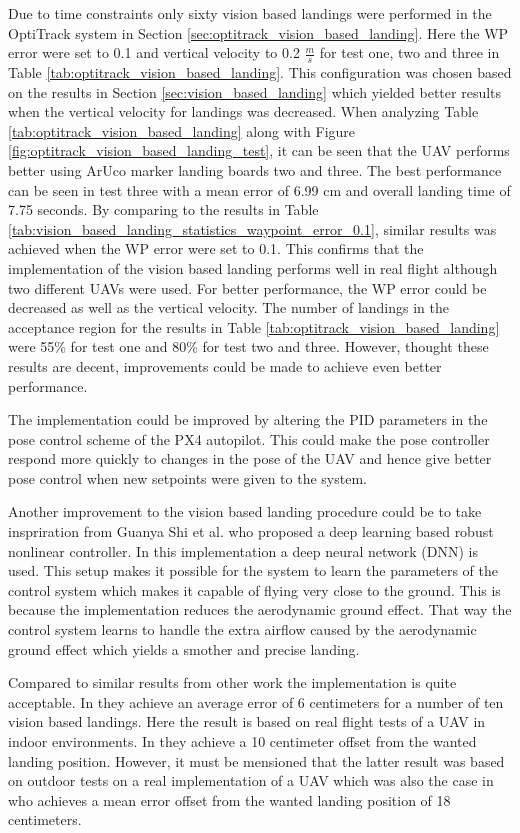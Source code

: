 \documentclass[../Head/report.tex]{subfiles}
\begin{document}
Due to time constraints only sixty vision based landings were performed in the OptiTrack system in Section \ref{sec:optitrack_vision_based_landing}. Here the WP error were set to 0.1 and vertical velocity to 0.2 $\frac{m}{s}$ for test one, two and three in Table \ref{tab:optitrack_vision_based_landing}. This configuration was chosen based on the results in Section \ref{sec:vision_based_landing} which yielded better results when the vertical velocity for landings was decreased. When analyzing Table \ref{tab:optitrack_vision_based_landing} along with Figure \ref{fig:optitrack_vision_based_landing_test}, it can be seen that the UAV performs better using ArUco marker landing boards two and three. The best performance can be seen in test three with a mean error of 6.99 cm and overall landing time of 7.75 seconds. By comparing to the results in Table \ref{tab:vision_based_landing_statistics_waypoint_error_0.1}, similar results was achieved when the WP error were set to 0.1. This confirms that the implementation of the vision based landing performs well in real flight although two different UAVs were used. For better performance, the WP error could be decreased as well as the vertical velocity. The number of landings in the acceptance region for the results in Table \ref{tab:optitrack_vision_based_landing} were 55\% for test one and 80\% for test two and three. However, thought these results are decent, improvements could be made to achieve even better performance.  

The implementation could be improved by altering the PID parameters in the pose control scheme of the PX4 autopilot. This could make the pose controller respond more quickly to changes in the pose of the UAV and hence give better pose control when new setpoints were given to the system.    

Another improvement to the vision based landing procedure could be to take inspriration from Guanya Shi et al. \cite{NeuralLander} who proposed a deep
learning based robust nonlinear controller. In this implementation a deep neural network (DNN) is used. This setup makes it possible for the system to learn the parameters of the control system which makes it capable of flying very close to the ground. This is because the implementation reduces the aerodynamic ground effect. That way the control system learns to handle the extra airflow caused by the aerodynamic ground effect which yields a smother and precise landing.  

Compared to similar results from other work the implementation is quite acceptable. In \cite[p.~5]{AutomaticnavigationandlandingofanindoorAR} they achieve an average error of 6 centimeters for a number of ten vision based landings. Here the result is based on real flight tests of a UAV in indoor environments. In \cite[p.~56]{AutonomousRechargingSystemforDronesTwo} they achieve a 10 centimeter offset from the wanted landing position. However, it must be mensioned that the latter result was based on outdoor tests on a real implementation of a UAV which was also the case in \cite[p.~6]{AVisionBasedSystemForAutonomousVerticaLanding} who achieves a mean error offset from the wanted landing position of 18 centimeters.
\end{document}
